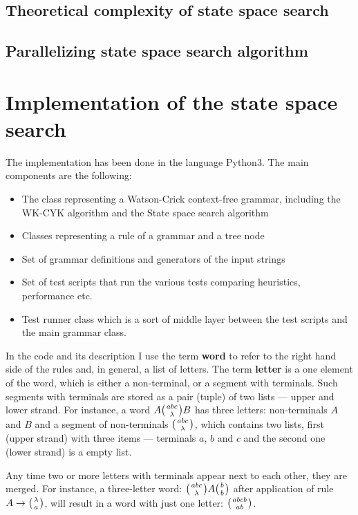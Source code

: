 \section{Theoretical complexity of state space search}

\section{Parallelizing state space search algorithm}

\chapter{Implementation of the state space search} \label{chapter:implementation}

The implementation has been done in the language Python3. The main components are the following:
\begin{itemize}
  \item{The class representing a Watson-Crick context-free grammar, including the WK-CYK algorithm and the State space search algorithm}
  \item{Classes representing a rule of a grammar and a tree node}
  \item{Set of grammar definitions and generators of the input strings}
  \item{Set of test scripts that run the various tests comparing heuristics, performance etc.}
  \item{Test runner class which is a sort of middle layer between the test scripts and the main grammar class.}
\end{itemize}

In the code and its description I use the term \textbf{word} to refer to the right hand side of the rules and, in general, a list of letters. The term \textbf{letter} is a one element of the word, which is either a non-terminal, or a segment with terminals. Such segments with terminals are stored as a pair (tuple) of two lists --- upper and lower strand. For instance, a word
$A \wkpair{abc}{\lambda} B$
has three letters: non-terminals $A$ and $B$ and a segment of non-terminals $\wkpair{abc}{\lambda}$, which contains two lists, first (upper strand) with three items --- terminals $a$, $b$ and $c$ and the second one (lower strand) is a empty list.

Any time two or more letters with terminals appear next to each other, they are merged. For instance, a three-letter word: $\wkpair{abc}{\lambda} A \wkpair{b}{b}$ after application of rule $A \rightarrow \wkpair{\lambda}{a}$, will result in a word with just one letter: $\wkpair{abcb}{ab}$.



